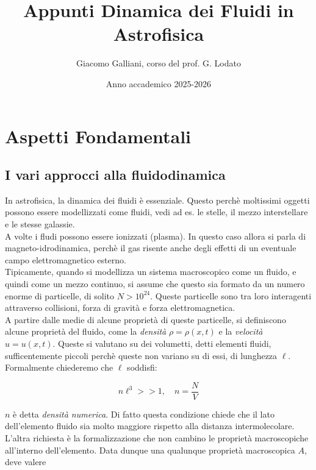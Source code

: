 \documentclass{report}
\title{\Huge{Appunti Dinamica dei Fluidi in Astrofisica}}
\author{Giacomo Galliani, corso del prof. G. Lodato}
\date{Anno accademico 2025-2026}
\renewcommand{\contentsname}{Indice}
\begin{document}
\maketitle
\newpage%
\pdfbookmark[section]{\contentsname}{toc}
\tableofcontents
\pagebreak

\chapter{Aspetti Fondamentali}

\section{I vari approcci alla fluidodinamica}

In astrofisica, la dinamica dei fluidi è essenziale. Questo perchè moltissimi oggetti possono essere modellizzati come fluidi, vedi ad es. le stelle, il mezzo interstellare e le stesse galassie. \\

A volte i fludi possono essere ionizzati (plasma). In questo caso allora si parla di magneto-idrodinamica, perchè il gas risente anche degli effetti di un eventuale campo elettromagnetico esterno. \\

Tipicamente, quando si modellizza un sistema macroscopico come un fluido, e quindi come un mezzo continuo, si assume che questo sia formato da un numero enorme di particelle, di solito $N > 10^{24}$. Queste particelle sono tra loro interagenti attraverso collisioni, forza di gravità e forza elettromagnetica. \\

A partire dalle medie di alcune proprietà di queste particelle, si definiscono alcune proprietà del fluido, come la \emph{densità} $\rho = \rho(x, t)$ e la \emph{velocità} $u = u(x, t)$. Queste si valutano su dei volumetti, detti elementi fluidi, sufficentemente piccoli perchè queste non variano su di essi, di lunghezza $\ell$. Formalmente chiederemo che $\ell$ soddisfi: 

\begin{equation}
    n\ell^3 >> 1, \quad n = \frac{N}{V} 
\end{equation}

$n$ è detta \emph{densità numerica}. Di fatto questa condizione chiede che il lato dell'elemento fluido sia molto maggiore rispetto alla distanza intermolecolare. L'altra richiesta è la formalizzazione che non cambino le proprietà macroscopiche all'interno dell'elemento. Data dunque una qualunque proprietà macroscopica $A$, deve valere 
\end{document}

